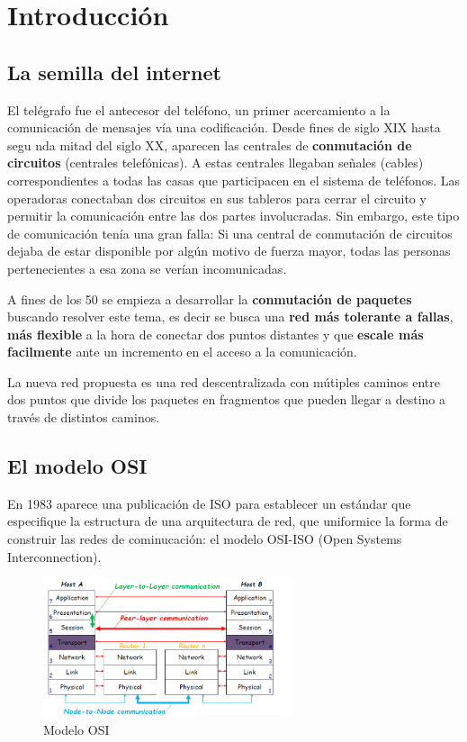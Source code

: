 \section{Introducción}
\subsection{La semilla del internet}  
El telégrafo fue el antecesor del teléfono, un primer acercamiento a la comunicación de
mensajes vía una codificación. Desde fines de siglo XIX hasta segu  nda mitad del siglo XX,
aparecen las centrales de \textbf{conmutación de circuitos} (centrales telefónicas). A estas centrales
llegaban señales (cables) correspondientes a todas las casas que participacen en el sistema de
teléfonos. Las operadoras conectaban dos circuitos en sus tableros para cerrar el circuito y
permitir la comunicación entre las dos partes involucradas. Sin embargo, este tipo de comunicación tenía una gran falla: Si una central de conmutación de circuitos
dejaba de estar disponible por algún motivo de fuerza mayor, todas las personas pertenecientes a esa
zona se verían incomunicadas.


A fines de los 50 se empieza a desarrollar la \textbf{conmutación de paquetes} buscando resolver este tema, es decir se busca una \textbf{red más tolerante a fallas}, \textbf{más flexible} a la hora de conectar dos puntos distantes y que \textbf{escale más facilmente} ante un incremento en el acceso a la comunicación.

La nueva red propuesta es una red descentralizada con mútiples caminos entre dos puntos que divide los paquetes en fragmentos que pueden llegar a destino a través de distintos caminos.

\subsection*{El modelo OSI}
En 1983 aparece una publicación de ISO para establecer un estándar que especifique la estructura de una arquitectura de red, que uniformice la forma de construir las redes de cominucación: el modelo OSI-ISO (Open Systems Interconnection).

\begin{figure}[h]
	\centering
	\includegraphics[width=0.65\textwidth
]{images/osi.png}
	\caption[Modelo OSI de Referencia]{Modelo OSI}
	\label{fig:osi}
\end{figure}

